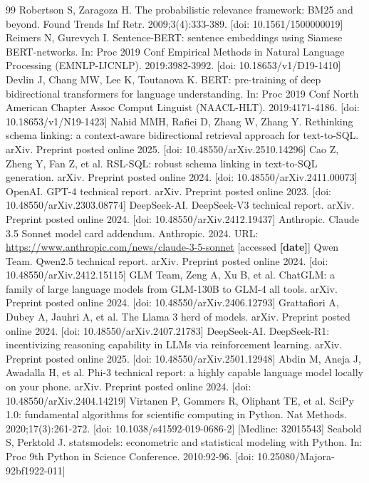 \documentclass[10pt,twocolumn]{article}
\newcommand{\PH}[1]{{\color{red}\textbf{[#1]}}}
\begin{document}
\begin{thebibliography}{99}
 Robertson S, Zaragoza H. The probabilistic relevance framework: BM25 and beyond. Found Trends Inf Retr. 2009;3(4):333-389. [doi: 10.1561/1500000019]
 Reimers N, Gurevych I. Sentence-BERT: sentence embeddings using Siamese BERT-networks. In: Proc 2019 Conf Empirical Methods in Natural Language Processing (EMNLP-IJCNLP). 2019:3982-3992. [doi: 10.18653/v1/D19-1410]
 Devlin J, Chang MW, Lee K, Toutanova K. BERT: pre-training of deep bidirectional transformers for language understanding. In: Proc 2019 Conf North American Chapter Assoc Comput Linguist (NAACL-HLT). 2019:4171-4186. [doi: 10.18653/v1/N19-1423]
 Nahid MMH, Rafiei D, Zhang W, Zhang Y. Rethinking schema linking: a context-aware bidirectional retrieval approach for text-to-SQL. arXiv. Preprint posted online 2025. [doi: 10.48550/arXiv.2510.14296]
 Cao Z, Zheng Y, Fan Z, et al. RSL-SQL: robust schema linking in text-to-SQL generation. arXiv. Preprint posted online 2024. [doi: 10.48550/arXiv.2411.00073]
 OpenAI. GPT-4 technical report. arXiv. Preprint posted online 2023. [doi: 10.48550/arXiv.2303.08774]
 DeepSeek-AI. DeepSeek-V3 technical report. arXiv. Preprint posted online 2024. [doi: 10.48550/arXiv.2412.19437]
 Anthropic. Claude 3.5 Sonnet model card addendum. Anthropic. 2024. URL: \url{https://www.anthropic.com/news/claude-3-5-sonnet} [accessed \PH{date}]
 Qwen Team. Qwen2.5 technical report. arXiv. Preprint posted online 2024. [doi: 10.48550/arXiv.2412.15115]
 GLM Team, Zeng A, Xu B, et al. ChatGLM: a family of large language models from GLM-130B to GLM-4 all tools. arXiv. Preprint posted online 2024. [doi: 10.48550/arXiv.2406.12793]
 Grattafiori A, Dubey A, Jauhri A, et al. The Llama 3 herd of models. arXiv. Preprint posted online 2024. [doi: 10.48550/arXiv.2407.21783]
 DeepSeek-AI. DeepSeek-R1: incentivizing reasoning capability in LLMs via reinforcement learning. arXiv. Preprint posted online 2025. [doi: 10.48550/arXiv.2501.12948]
 Abdin M, Aneja J, Awadalla H, et al. Phi-3 technical report: a highly capable language model locally on your phone. arXiv. Preprint posted online 2024. [doi: 10.48550/arXiv.2404.14219]
 Virtanen P, Gommers R, Oliphant TE, et al. SciPy 1.0: fundamental algorithms for scientific computing in Python. Nat Methods. 2020;17(3):261-272. [doi: 10.1038/s41592-019-0686-2] [Medline: 32015543]
 Seabold S, Perktold J. statsmodels: econometric and statistical modeling with Python. In: Proc 9th Python in Science Conference. 2010:92-96. [doi: 10.25080/Majora-92bf1922-011]

\end{thebibliography}
\end{document}
